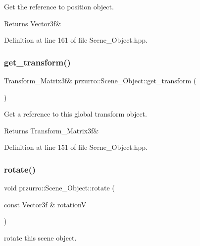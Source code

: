 Get the reference to position object. 

\begin{DoxyReturn}{Returns}
Vector3f\& 
\end{DoxyReturn}


Definition at line 161 of file Scene\+\_\+\+Object.\+hpp.

\mbox{\label{classprzurro_1_1_scene___object_ab0e3eea8f57f4f8dac0597cebfbf3592}} 
\subsubsection{\texorpdfstring{get\_transform()}{get\_transform()}}
{\footnotesize\ttfamily Transform\+\_\+\+Matrix3f\& przurro\+::\+Scene\+\_\+\+Object\+::get\+\_\+transform (\begin{DoxyParamCaption}{ }\end{DoxyParamCaption})\hspace{0.3cm}{\ttfamily [inline]}}



Get a reference to this global transform object. 

\begin{DoxyReturn}{Returns}
Transform\+\_\+\+Matrix3f\& 
\end{DoxyReturn}


Definition at line 151 of file Scene\+\_\+\+Object.\+hpp.

\mbox{\label{classprzurro_1_1_scene___object_a417701b484844d3eaeba812c90a2821d}} 
\subsubsection{\texorpdfstring{rotate()}{rotate()}}
{\footnotesize\ttfamily void przurro\+::\+Scene\+\_\+\+Object\+::rotate (\begin{DoxyParamCaption}\item[{const Vector3f \&}]{rotationV }\end{DoxyParamCaption})}



rotate this scene object. 


